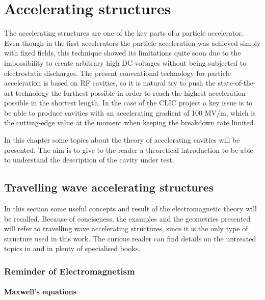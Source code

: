 \chapter[Accelerating structures]{Accelerating structures}

The accelerating structures are one of the key parts of a particle accelerator. Even though in the first accelerators the particle acceleration was achieved simply with fixed fields, this technique showed its limitations quite soon due to the impossibility to create arbitrary high DC voltages without being subjected to electrostatic discharges. The present conventional technology for particle acceleration is based on RF cavities, so it is natural try to push the state-of-the-art technology the furthest possible in order to reach the highest acceleration possible in the shortest length. In the case of the CLIC project a key issue is to be able to produce cavities with an accelerating gradient of 100 MV/m, which is the cutting-edge value at the moment when keeping the breakdown rate limited.

In this chapter some topics about the theory of accelerating cavities will be presented. The aim is to give to the reader a theoretical introduction to be able to understand the description of the cavity under test.

\section[Travelling wave accelerating structures]{Travelling wave accelerating structures}

In this section some useful concepts and result of the electromagnetic theory will be recalled. Because of conciseness, the examples and the geometries presented will refer to travelling wave accelerating structures, since it is the only type of structure used in this work. The curious reader can find details on the untreated topics in \cite{Weiss:261732,Wangler:RF_LINAC,Humphries:107756} and in plenty of specialised books.

\subsection[Reminder of Electromagnetism]{Reminder of Electromagnetism}

\subsubsection{Maxwell's equations}

